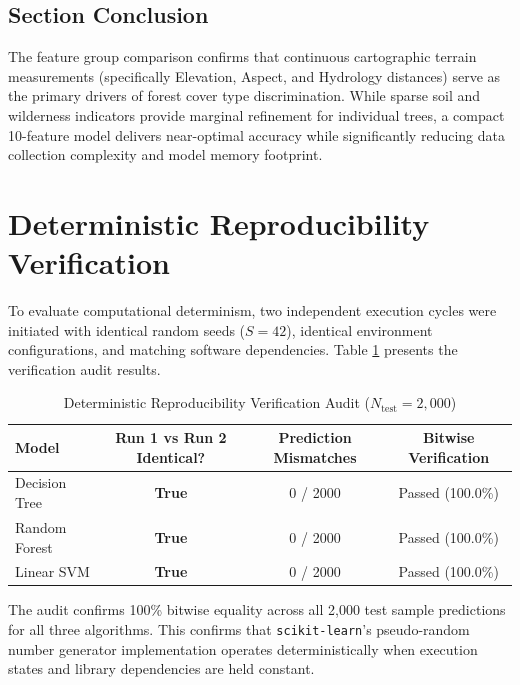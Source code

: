 \subsection{Section Conclusion}
The feature group comparison confirms that continuous cartographic terrain measurements (specifically Elevation, Aspect, and Hydrology distances) serve as the primary drivers of forest cover type discrimination. While sparse soil and wilderness indicators provide marginal refinement for individual trees, a compact 10-feature model delivers near-optimal accuracy while significantly reducing data collection complexity and model memory footprint.

\section{Deterministic Reproducibility Verification}
\label{sec:reproducibility_audit}

To evaluate computational determinism, two independent execution cycles were initiated with identical random seeds ($S = 42$), identical environment configurations, and matching software dependencies. Table \ref{tab:reproducibility} presents the verification audit results.

\begin{table}[H]
\centering
\caption{Deterministic Reproducibility Verification Audit ($N_{\text{test}} = 2,000$)}
\label{tab:reproducibility}
\begin{tabular}{lccc}
\toprule
\textbf{Model} & \textbf{Run 1 vs Run 2 Identical?} & \textbf{Prediction Mismatches} & \textbf{Bitwise Verification} \\
\midrule
Decision Tree & \textbf{True} & 0 / 2000 & Passed (100.0\%) \\
Random Forest & \textbf{True} & 0 / 2000 & Passed (100.0\%) \\
Linear SVM & \textbf{True} & 0 / 2000 & Passed (100.0\%) \\
\bottomrule
\end{tabular}
\end{table}

The audit confirms 100\% bitwise equality across all 2,000 test sample predictions for all three algorithms. This confirms that \texttt{scikit-learn}'s pseudo-random number generator implementation operates deterministically when execution states and library dependencies are held constant.


